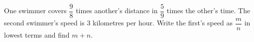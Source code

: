 One swimmer covers $\dfrac{9}{8}$ times another's distance in $\dfrac{5}{9}$ times the other's time. The second swimmer's speed is 3 kilometres per hour. Write the first's speed as $\dfrac{m}{n}$ in lowest terms and find $m+n$.
